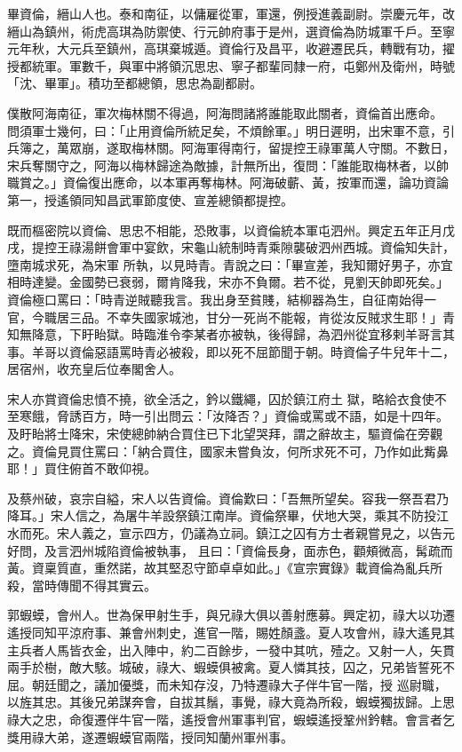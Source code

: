 \begin{pinyinscope}
 畢資倫，縉山人也。泰和南征，以傭雇從軍，軍還，例授進義副尉。崇慶元年，改縉山為鎮州，術虎高琪為防禦使、行元帥府事于是州，選資倫為防城軍千戶。至寧元年秋，大元兵至鎮州，高琪棄城遁。資倫行及昌平，收避遷民兵，轉戰有功，擢授都統軍。軍數千，與軍中將領沉思忠、寧子都輩同隸一府，屯鄭州及衛州，時號「沈、畢軍」。積功至都總領，思忠為副都尉。



 僕散阿海南征，軍次梅林關不得過，阿海問諸將誰能取此關者，資倫首出應命。
 問須軍士幾何，曰：「止用資倫所統足矣，不煩餘軍。」明日遲明，出宋軍不意，引兵簿之，萬眾崩，遂取梅林關。阿海軍得南行，留提控王祿軍萬人守關。不數日，宋兵奪關守之，阿海以梅林歸途為敵據，計無所出，復問：「誰能取梅林者，以帥職賞之。」資倫復出應命，以本軍再奪梅林。阿海破蘄、黃，按軍而還，論功資論第一，授遙領同知昌武軍節度使、宣差總領都提控。



 既而樞密院以資倫、思忠不相能，恐敗事，以資倫統本軍屯泗州。興定五年正月戊戌，提控王祿湯餅會軍中宴飲，宋龜山統制時青乘隙襲破泗州西城。資倫知失計，墮南城求死，為宋軍
 所執，以見時青。青說之曰：「畢宣差，我知爾好男子，亦宜相時達變。金國勢已衰弱，爾肯降我，宋亦不負爾。若不從，見劉天帥即死矣。」資倫極口罵曰：「時青逆賊聽我言。我出身至貧賤，結柳器為生，自征南始得一官，今職居三品。不幸失國家城池，甘分一死尚不能報，肯從汝反賊求生耶！」青知無降意，下盱眙獄。時臨淮令李某者亦被執，後得歸，為泗州從宜移剌羊哥言其事。羊哥以資倫惡語罵時青必被殺，即以死不屈節聞于朝。時資倫子牛兒年十二，居宿州，收充皇后位奉閣舍人。



 宋人亦賞資倫忠憤不撓，欲全活之，鈐以鐵繩，囚於鎮江府土
 獄，略給衣食使不至寒餓，脅誘百方，時一引出問云：「汝降否？」資倫或罵或不語，如是十四年。及盱眙將士降宋，宋使總帥納合買住已下北望哭拜，謂之辭故主，驅資倫在旁觀之。資倫見買住罵曰：「納合買住，國家未嘗負汝，何所求死不可，乃作如此觜鼻耶！」買住俯首不敢仰視。



 及蔡州破，哀宗自縊，宋人以告資倫。資倫歎曰：「吾無所望矣。容我一祭吾君乃降耳。」宋人信之，為屠牛羊設祭鎮江南岸。資倫祭畢，伏地大哭，乘其不防投江水而死。宋人義之，宣示四方，仍議為立祠。鎮江之囚有方士者親嘗見之，以告元好問，及言泗州城陷資倫被執事，
 且曰：「資倫長身，面赤色，顴頰微高，髯疏而黃。資稟質直，重然諾，故其堅忍守節卓卓如此。」《宣宗實錄》載資倫為亂兵所殺，當時傳聞不得其實云。



 郭蝦蟆，會州人。世為保甲射生手，與兄祿大俱以善射應募。興定初，祿大以功遷遙授同知平涼府事、兼會州刺史，進官一階，賜姓顏盞。夏人攻會州，祿大遙見其主兵者人馬皆衣金，出入陣中，約二百餘步，一發中其吭，殪之。又射一人，矢貫兩手於樹，敵大駭。城破，祿大、蝦蟆俱被禽。夏人憐其技，囚之，兄弟皆誓死不屈。朝廷聞之，議加優獎，而未知存沒，乃特遷祿大子伴牛官一階，授
 巡尉職，以旌其忠。其後兄弟謀奔會，自拔其鬚，事覺，祿大竟為所殺，蝦蟆獨拔歸。上思祿大之忠，命復遷伴牛官一階，遙授會州軍事判官，蝦蟆遙授鞏州鈐轄。會言者乞獎用祿大弟，遂遷蝦蟆官兩階，授同知蘭州軍州事。




\end{pinyinscope}
